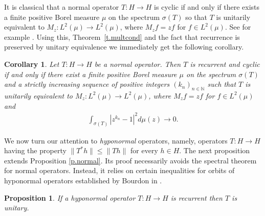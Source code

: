 \documentclass[12pt,leqno]{amsart}
\theoremstyle{plain}
\newtheorem{proposition}[equation]{Proposition}
\newtheorem{corollary}[equation]{Corollary}
\theoremstyle{definition}
\numberwithin{equation}{section}
\begin{document}
It is classical that a normal operator $T:H\to H$ is cyclic if and only if there exists a finite positive Borel measure $\mu $ on the spectrum $\sigma (T)$ so that $T$ is unitarily equivalent to $M_z:L^2(\mu)\to L^2(\mu)$, where $M_zf=zf$ for $f\in L^2(\mu)$. See for example \cite{Con}. Using this, Theorem~\ref{t.multcond} and the fact that recurrence is preserved by unitary equivalence we immediately get the following corollary. 

\begin{corollary}
	Let $T:H\to H$ be a normal operator. Then $T$ is recurrent and cyclic if and only if there exist a finite positive Borel measure $\mu $ on the spectrum $\sigma (T)$ and a strictly increasing sequence of positive integers $(k_n)_{n\in\mathbb N}$ such that $T$ is unitarily equivalent to $M_z:L^2(\mu)\to L^2(\mu)$, where $M_zf=zf$ for $f\in L^2(\mu)$ and 
	\begin{align*}
		\int_{\sigma (T)}|z^{k_n}-1|^2d\mu (z) \to 0. 
	\end{align*}
\end{corollary}

We now turn our attention to \emph{hyponormal} operators, namely, operators $T:H\to H$ having the property $\| T^*h\| \leq \| Th\|$ for every $h\in H$. The next proposition extends Proposition \ref{p.normal}. Its proof necessarily avoids the spectral theorem for normal operators. Instead, it relies on certain inequalities for orbits of hyponormal operators established by Bourdon in \cite{Bourdon}. 

\begin{proposition}
	\label{p.normalimpliesunit} If a hyponormal operator $T:H\to H$ is recurrent then $T$ is unitary. 
\end{proposition}
\end{document}
